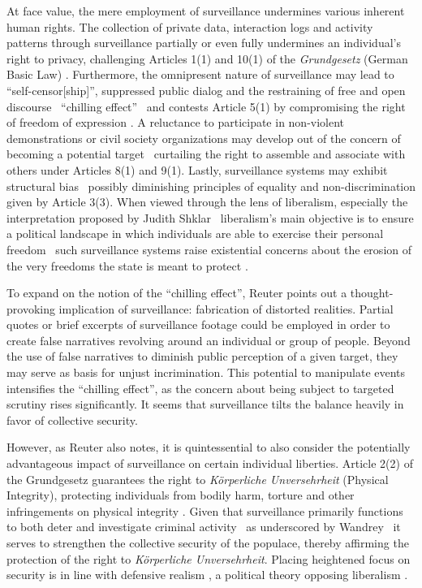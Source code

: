 \documentclass[12pt]{article}
\begin{document}
	At face value, the mere employment of surveillance undermines various inherent human rights. The collection of private data, interaction logs and activity patterns through surveillance partially or even fully undermines an individual's right to privacy, challenging Articles 1(1) and 10(1) of the \textit{Grundgesetz} (German Basic Law) \parencites{nandy2023, wetzling2023, grundgesetz2025}. Furthermore, the omnipresent nature of surveillance may lead to ``self-censor[ship]'', suppressed public dialog and the restraining of free and open discourse \textemdash\ ``chilling effect'' \textemdash\ and contests Article 5(1) by compromising the right of freedom of expression \parencite{murray2024}. A reluctance to participate in non-violent demonstrations or civil society organizations may develop out of the concern of becoming a potential target \textemdash\ curtailing the right to assemble and associate with others under Articles 8(1) and 9(1). Lastly, surveillance systems may exhibit structural bias \textemdash\ possibly diminishing principles of equality and non-discrimination given by Article 3(3). When viewed through the lens of liberalism, especially the interpretation proposed by Judith Shklar \textemdash\ liberalism's main objective is to ensure a political landscape in which individuals are able to exercise their personal freedom \textemdash\ such surveillance systems raise existential concerns about the erosion of the very freedoms the state is meant to protect \parencite[684]{bell2014}.
	
	To expand on the notion of the ``chilling effect'', Reuter points out a thought-provoking implication of surveillance: fabrication of distorted realities. Partial quotes or brief excerpts of surveillance footage could be employed in order to create false narratives revolving around an individual or group of people. Beyond the use of false narratives to diminish public perception of a given target, they may serve as basis for unjust incrimination. This potential to manipulate events intensifies the ``chilling effect'', as the concern about being subject to targeted scrutiny rises significantly. It seems that surveillance tilts the balance heavily in favor of collective security.
	
	However, as Reuter also notes, it is quintessential to also consider the potentially advantageous impact of surveillance on certain individual liberties. Article 2(2) of the Grundgesetz guarantees the right to \textit{Körperliche Unversehrheit} (Physical Integrity), protecting individuals from bodily harm, torture and other infringements on physical integrity \parencite{bildung_korperliche_nodate}. Given that surveillance primarily functions to both deter and investigate criminal activity \textemdash\ as underscored by Wandrey \textemdash\ it serves to strengthen the collective security of the populace, thereby affirming the protection of the right to \textit{Körperliche Unversehrheit}. Placing heightened focus on security is in line with defensive realism \parencite{courseCompanion2024}, a political theory opposing liberalism \parencite{jumarang2011}.  
	
\end{document}
